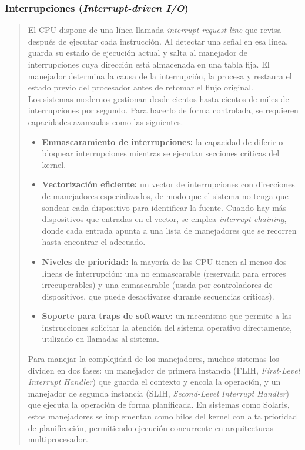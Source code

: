 \documentclass[12pt,letterpaper]{article}
\begin{document}
\subsubsection*{Interrupciones (\textit{Interrupt-driven I/O})}
\begin{quote}
  El CPU dispone de una línea llamada \textit{interrupt-request line} que revisa después de ejecutar cada
  instrucción. Al detectar una señal en esa línea, guarda su estado de ejecución actual y salta al manejador de
  interrupciones cuya dirección está almacenada en una tabla fija. El manejador determina la causa de la
  interrupción, la procesa y restaura el estado previo del procesador antes de retomar el flujo original.\\
  
  Los sistemas modernos gestionan desde cientos hasta cientos de miles de interrupciones por segundo.
  Para hacerlo de forma controlada, se requieren capacidades avanzadas como las siguientes.
  
  \begin{itemize}
  \item \textbf{Enmascaramiento de interrupciones:} la capacidad de diferir o
    bloquear interrupciones mientras se ejecutan secciones críticas del kernel.
  \item \textbf{Vectorización eficiente:} un vector de interrupciones con
    direcciones de manejadores especializados, de modo que el sistema no tenga
    que sondear cada dispositivo para identificar la fuente. Cuando hay más
    dispositivos que entradas en el vector, se emplea \textit{interrupt chaining},
    donde cada entrada apunta a una lista de manejadores que se recorren hasta
    encontrar el adecuado.
  \item \textbf{Niveles de prioridad:} la mayoría de las CPU tienen al menos
    dos líneas de interrupción: una no enmascarable (reservada para errores
    irrecuperables) y una enmascarable (usada por controladores de dispositivos,
    que puede desactivarse durante secuencias críticas).
  \item \textbf{Soporte para traps de software:} un mecanismo que permite a
    las instrucciones solicitar la atención del sistema operativo directamente,
    utilizado en llamadas al sistema.
  \end{itemize}
  
  Para manejar la complejidad de los manejadores, muchos sistemas los dividen en dos fases: un manejador de
  primera instancia (FLIH, \textit{First-Level Interrupt Handler}) que guarda el contexto y encola la operación,
  y un manejador de segunda instancia (SLIH, \textit{Second-Level Interrupt Handler}) que ejecuta la operación
  de forma planificada. En sistemas como Solaris, estos manejadores se implementan como hilos del kernel con
  alta prioridad de planificación, permitiendo ejecución concurrente en arquitecturas multiprocesador.
\end{quote}
\end{document}

